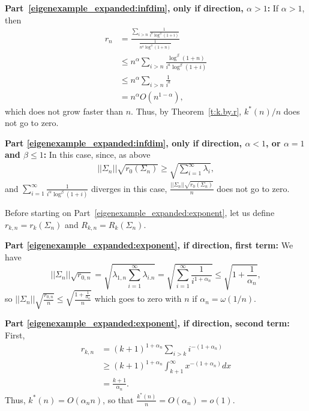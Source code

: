\documentclass[11pt,notitlepage]{article}
\begin{document}
\noindent
{\bf Part~\ref{eigenexample_expanded:infdim}, only if direction, $\alpha > 1$:}  
If $\alpha > 1$, then 
\begin{align*}
r_n 
 & = \frac{ \sum_{i > n} \frac{1}{i^a \log^{\beta} (1 + i)}}
          {\frac{1}{n^a \log^{\beta} (1 + n)}} \\
 & \leq n^{\alpha} 
    \sum_{i > n} \frac{\log^{\beta} (1 + n)}{i^a \log^{\beta} (1 + i)} \\
 & \leq n^{\alpha} 
    \sum_{i > n} \frac{1}{i^a} \\
 & = n^{\alpha} O(n^{1 - \alpha}),
\end{align*}
which does not grow faster than $n$.  Thus, by
Theorem~\ref{t:k.by.r}, $k^\ast(n)/n$ does not go to zero.

\noindent
{\bf Part \ref{eigenexample_expanded:infdim}, only if direction, 
   $\alpha < 1$, or $\alpha = 1$ and $\beta \leq 1$:}  
In this case, since, as above
\begin{align*}
|| \Sigma_n || \sqrt{r_0(\Sigma_n)} 
  \geq  \sqrt{\sum_{i=1}^{\infty} \lambda_i},
\end{align*}
and $\sum_{i=1}^{\infty} \frac{1}{i^{\alpha} \log^{\beta} (1 + i)}$
diverges in this case, 
$\frac{|| \Sigma_n || \sqrt{r_0(\Sigma_n)}}{n}$ does not go to zero.

\noindent
Before starting on Part~\ref{eigenexample_expanded:exponent},
let us define $r_{k,n} = r_k(\Sigma_n)$ and $R_{k,n} = R_k(\Sigma_n)$.

\noindent
{\bf Part \ref{eigenexample_expanded:exponent}, if direction, first term:}  We have
\[
|| \Sigma_n || \sqrt{r_{0,n}} 
  = \sqrt{ \lambda_{1,n} \sum_{i=1}^{\infty} \lambda_{i.n}}
      = \sqrt{\sum_{i=1}^{\infty} \frac{1}{i^{1+\alpha_n}}}
      \leq \sqrt{1 + \frac{1}{\alpha_n}},
\]
so $|| \Sigma_n || \sqrt{ \frac{ r_{0,n}}{n}} \leq \sqrt{\frac{1 +
    \frac{1}{\alpha_n}}{n}}$ which goes to zero with $n$ if $\alpha_n
= \omega(1/n)$.

\noindent
{\bf Part \ref{eigenexample_expanded:exponent}, if direction, second term:}  
First, 
\begin{align*}
r_{k,n}
& = (k+1)^{1 + \alpha_n} \sum_{i > k} i^{-(1 + \alpha_n)} \\
& \geq (k+1)^{1 + \alpha_n} \int_{k+1}^{\infty} x^{-(1 + \alpha_n)} dx \\
& = \frac{k+1}{\alpha_n}.
\end{align*}
Thus, $k^*(n) = O(\alpha_n n)$, so that 
$\frac{k^*(n)}{n} = O(\alpha_n) = o(1)$.
\end{document}
